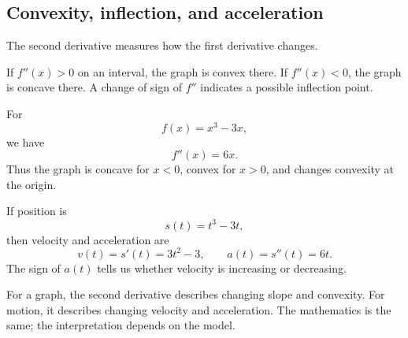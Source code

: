 \subsection{Convexity, inflection, and acceleration}

The second derivative measures how the first derivative changes.

\begin{theorembox}
If $f''(x)>0$ on an interval, the graph is convex there. If $f''(x)<0$, the graph is concave there. A change of sign of $f''$ indicates a possible inflection point.
\end{theorembox}

\begin{examplebox}
For
\[
f(x)=x^3-3x,
\]
we have
\[
f''(x)=6x.
\]
Thus the graph is concave for $x<0$, convex for $x>0$, and changes convexity at the origin.
\end{examplebox}

\begin{examplebox}[Acceleration]
If position is
\[
s(t)=t^3-3t,
\]
then velocity and acceleration are
\[
v(t)=s'(t)=3t^2-3,
\qquad
a(t)=s''(t)=6t.
\]
The sign of $a(t)$ tells us whether velocity is increasing or decreasing.
\end{examplebox}

\begin{interpretationbox}
For a graph, the second derivative describes changing slope and convexity. For motion, it describes changing velocity and acceleration. The mathematics is the same; the interpretation depends on the model.
\end{interpretationbox}
